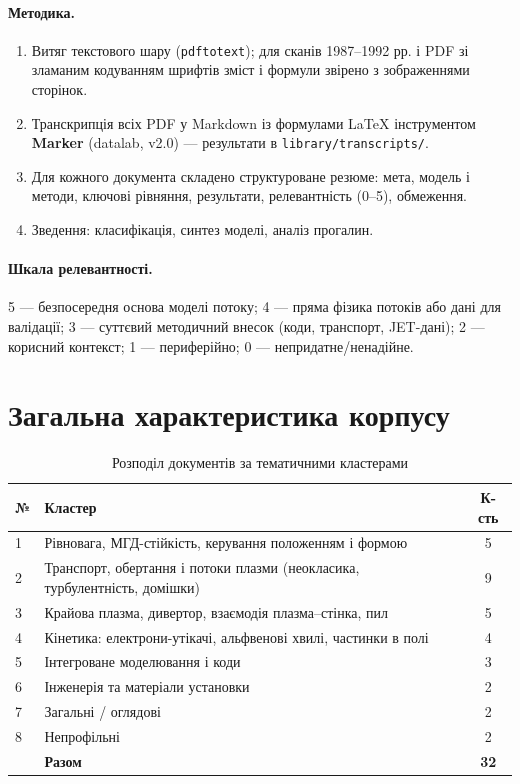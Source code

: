 \documentclass[11pt,a4paper]{article}
\newcommand{\file}[1]{\texttt{\small #1}}
\begin{document}
\paragraph{Методика.}
\begin{enumerate}
  \item Витяг текстового шару (\texttt{pdftotext}); для сканів 1987--1992 рр. і PDF
        зі зламаним кодуванням шрифтів зміст і формули звірено з зображеннями сторінок.
  \item Транскрипція всіх PDF у Markdown із формулами LaTeX інструментом
        \textbf{Marker} (datalab, v2.0) --- результати в \file{library/transcripts/}.
  \item Для кожного документа складено структуроване резюме: мета, модель і методи,
        ключові рівняння, результати, релевантність (0--5), обмеження.
  \item Зведення: класифікація, синтез моделі, аналіз прогалин.
\end{enumerate}

\paragraph{Шкала релевантності.} 5 --- безпосередня основа моделі потоку;
4 --- пряма фізика потоків або дані для валідації; 3 --- суттєвий методичний
внесок (коди, транспорт, JET-дані); 2 --- корисний контекст; 1 --- периферійно;
0 --- непридатне/ненадійне.

\section{Загальна характеристика корпусу}

\begin{table}[h]
\centering
\caption{Розподіл документів за тематичними кластерами}
\label{tab:clusters}
\begin{tabularx}{\textwidth}{@{}lXc@{}}
\toprule
№ & Кластер & К-сть \\
\midrule
1 & Рівновага, МГД-стійкість, керування положенням і формою & 5 \\
2 & Транспорт, обертання і потоки плазми (неокласика, турбулентність, домішки) & 9 \\
3 & Крайова плазма, дивертор, взаємодія плазма--стінка, пил & 5 \\
4 & Кінетика: електрони-утікачі, альфвенові хвилі, частинки в полі & 4 \\
5 & Інтегроване моделювання і коди & 3 \\
6 & Інженерія та матеріали установки & 2 \\
7 & Загальні / оглядові & 2 \\
8 & Непрофільні & 2 \\
\midrule
 & \textbf{Разом} & \textbf{32} \\
\bottomrule
\end{tabularx}
\end{table}
\end{document}
